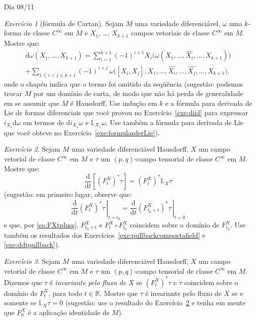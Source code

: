 \documentclass[oneside,11pt]{amsart}
\newcommand{\R}{\mathds R}
\newcommand{\dd}{\mathrm d}
\theoremstyle{remark}\newtheorem{exercise}{Exercício}[section]
\theoremstyle{plain}\newtheorem{teo}{Teorema}[section]
\theoremstyle{plain}\newtheorem{lem}[teo]{Lema}
\theoremstyle{plain}\newtheorem{prop}[teo]{Proposição}
\theoremstyle{definition}\newtheorem{defin}[teo]{Definição}
\theoremstyle{remark}\newtheorem{rem}[teo]{Observação}
\theoremstyle{definition}\newtheorem{example}[teo]{Exemplo}
\numberwithin{equation}{section}
\begin{document}
\begin{section}{Dia 08/11}
\begin{exercise}[fórmula de Cartan]
Sejam $M$ uma variedade diferenciável, $\omega$ uma $k$-forma de classe $C^\infty$ em $M$ e $X_1$, \dots, $X_{k+1}$ campos vetoriais de classe $C^\infty$
em $M$. Mostre que:
\begin{multline*}
\dd\omega(X_1,\ldots,X_{k+1})=\sum_{i=1}^{k+1}(-1)^{i+1}X_i\big(\omega(X_1,\ldots,\widehat{X_i},\ldots,X_{k+1})\big)\\
+\sum_{1\le i<j\le k+1}(-1)^{i+j}\,\omega\big([X_i,X_j],X_1,\ldots,\widehat{X_i},\ldots,\widehat{X_j},\ldots,X_{k+1}\big),
\end{multline*}
onde o chapéu indica que o termo foi omitido da seqüência (sugestão: podemos trocar $M$ por um domínio de carta, de modo que não há perda de generalidade
em se assumir que $M$ é Hausdorff. Use indução em $k$ e a fórmula para derivada de Lie de formas diferenciais que você provou no Exercício~\ref{exe:diid}
para expressar $i_{X_1}\dd\omega$ em termos de $\dd i_{X_1}\omega$ e $\mathbb L_{X_1}\omega$. Use também a fórmula para derivada de Lie que você obteve
no Exercício~\ref{exe:formulasderLie}).
\end{exercise}

\begin{exercise}\label{exe:ddtFXtstar}
Sejam $M$ uma variedade diferenciável Hausdorff, $X$ um campo vetorial de classe $C^\infty$ em $M$ e $\tau$ um $(p,q)$-campo tensorial de classe
$C^\infty$ em $M$. Mostre que:
\[\frac{\dd}{\dd t}[(F^X_t)^*\tau]=(F^X_t)^*\mathbb L_X\tau\]
(sugestão: em primeiro lugar, observe que:
\[\left.\frac{\dd}{\dd t}(F^X_t)^*\tau\,\right\vert_{t=t_0}=\left.\frac{\dd}{\dd t}(F^X_{t_0+t})^*\tau\,\right\vert_{t=0}\]
e que, por \eqref{eq:FXtpluss}, $F^X_{t_0+t}$ e $F^X_t\circ F^X_{t_0}$ coincidem sobre o domínio de $F^X_{t_0}$. Use também os resultados dos
Exercícios~\ref{exe:pullbackcompostafield} e \ref{exe:ddtpullback}).
\end{exercise}

\begin{exercise}
Sejam $M$ uma variedade diferenciável Hausdorff, $X$ um campo vetorial de classe $C^\infty$ em $M$ e $\tau$ um $(p,q)$-campo tensorial de classe
$C^\infty$ em $M$. Dizemos que $\tau$ é {\em invariante pelo fluxo de $X$\/} se $(F^X_t)^*\tau$ e $\tau$ coincidem sobre o domínio
de $F^X_t$, para todo $t\in\R$. Mostre que $\tau$ é invariante pelo fluxo de $X$ se e somente se $\mathbb L_X\tau=0$ (sugestão:
use o resultado do Exercício~\ref{exe:ddtFXtstar} e tenha em mente que $F^X_0$ é a aplicação identidade de $M$).
\end{exercise}


\end{section}
\end{document}
